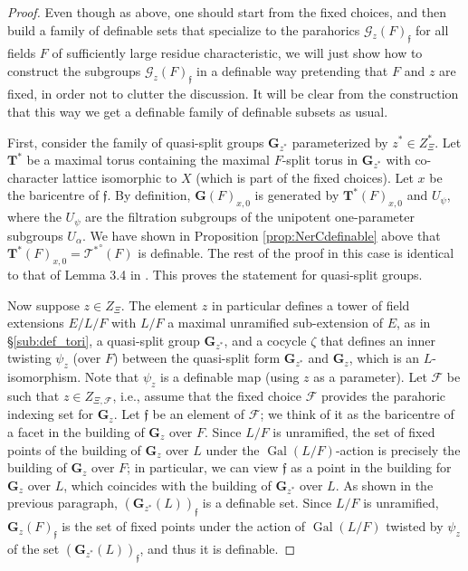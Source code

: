 \documentclass{amsart}
\newcommand{\cF}{\mathcal{F}}
\newcommand{\cG}{\mathcal{G}}
\DeclareMathOperator{\gal}{Gal}
\newcommand{\bG}{\mathbf{G}}
\newcommand{\bT}{\mathbf {T}}
\newcommand{\ff}{{\mathfrak f}}
\newcommand{\NerC}[1]{\mathcal{#1}^\circ}
\theoremstyle{plain}
\theoremstyle{definition}
\begin{document}
\begin{proof} Even though as above, one should start from the fixed choices, 
and then build a family of definable sets that specialize to the parahorics ${\cG_z(F)}_\ff$ for all fields $F$ of sufficiently large residue characteristic, we will just show how to construct the subgroups 
${\cG_z(F)}_\ff$ in a definable way pretending that $F$ and $z$ are fixed, in order not to clutter the discussion. It will be clear from the construction that this way we get a definable family of definable subsets as usual. 

First, consider the family of quasi-split groups $\bG_{z^\ast}$ parameterized by 
$z^\ast\in Z_{\Xi}^\ast$. 
Let $\bT^\ast$ be a maximal torus containing the maximal $F$-split torus in 
$\bG_{z^\ast}$ with co-character lattice isomorphic to $X$ (which is part of the fixed choices).  
Let $x$ be the baricentre of $\ff$.
By definition, $\bG(F)_{x,0}$ is generated by $\bT^\ast(F)_{x, 0}$ and $U_\psi$, where the $U_\psi$ are
the filtration subgroups of the unipotent one-parameter subgroups $U_{\alpha}$. 
We have shown in Proposition \ref{prop:NerCdefinable} above that  $\bT^\ast(F)_{x, 0}=\NerC{T^\ast}(F)$ is definable.
The rest of the proof in this case is identical to that of Lemma 3.4 in \cite{cluckers-gordon-halupczok:14b}. 
This proves the statement for quasi-split groups. 

Now suppose $z\in Z_\Xi$. The element $z$ in particular defines a tower of field extensions $E/L/F$ 
with $L/F$ a maximal unramified sub-extension of $E$, as in \S \ref{sub:def_tori}, a quasi-split group $\bG_{z^\ast}$,
 and a cocycle $\zeta$ that defines an inner twisting $\psi_z$ (over $F$) between the quasi-split form $\bG_{z^\ast}$ 
 and $\bG_z$, which is an $L$-isomorphism.  Note that $\psi_z$ is a definable map (using $z$ as a parameter). 
Let $\cF$ be such that $z\in Z_{\Xi, \cF}$, i.e., assume that the fixed choice $\cF$ provides the parahoric indexing 
set for $\bG_z$. Let $\ff$ be an element of $\cF$; we think of it as the baricentre of a facet in the building of 
$\bG_z$ over $F$. Since $L/F$ is unramified, the set of fixed points of the building of $\bG_z$ over $L$ 
under the $\gal(L/F)$-action is precisely the building of $\bG_z$ over $F$; in particular, we can view $\ff$ as a point 
in the building for $\bG_z$ over $L$, which coincides with the building of $\bG_{z^\ast}$ over $L$.  
As shown in the previous paragraph, $(\bG_{z^\ast}(L))_\ff$ is a definable set. 
Since $L/F$ is unramified, $\bG_{z}(F)_\ff$ is the set of fixed points under the action of $\gal(L/F)$ twisted by $\psi_z$ of the set  $(\bG_{z^\ast}(L))_\ff$, and thus it is definable. 
\end{proof} 
\end{document}
